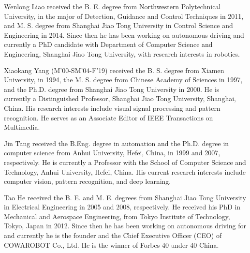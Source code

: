 \documentclass[10pt,journal,compsoc]{IEEEtran}
\begin{document}
\begin{IEEEbiography}{Wenlong Liao} received the B. E. degree from Northwestern Polytechnical University, in the major of Detection, Guidance and Control Techniques in 2011, and M. S. degree from Shanghai Jiao Tong University in Control Science and Engineering in 2014. Since then he has been working on autonomous driving and currently a PhD candidate with Department of Computer Science and Engineering, Shanghai Jiao Tong University, with research interests in robotics.
\end{IEEEbiography}

\begin{IEEEbiography}{Xiaokang Yang} (M'00-SM'04-F'19) received the B. S. degree from Xiamen University, in 1994, the M. S. degree from Chinese Academy of Sciences in 1997, and the Ph.D. degree from Shanghai Jiao Tong University in 2000. He is currently a Distinguished Professor, Shanghai Jiao Tong University, Shanghai, China. His research interests include visual signal processing and pattern recognition. He serves as an Associate Editor of IEEE Transactions on Multimedia.
\end{IEEEbiography}

\begin{IEEEbiography}{Jin Tang} received the B.Eng. degree in automation and the Ph.D. degree in computer science from Anhui University, Hefei, China, in 1999 and 2007, respectively. He is currently a Professor with the School of Computer Science and Technology, Anhui University, Hefei, China. His current research interests include computer vision, pattern recognition, and deep learning.
\end{IEEEbiography}
\begin{IEEEbiography}{Tao He} received the B. E. and M. E. degrees from Shanghai Jiao Tong University in Electrical Engineering in 2005 and 2008, respectively. He received his PhD in Mechanical and Aerospace Engineering, from Tokyo Institute of Technology, Tokyo, Japan in 2012. Since then he has been working on autonomous driving for and currently he is the founder and the Chief Executive Officer (CEO) of COWAROBOT Co., Ltd. He is the winner of Forbes 40 under 40 China.
\end{IEEEbiography}
\end{document}
